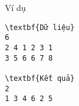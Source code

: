 Ví dụ
\begin{verbatim}
\textbf{Dữ liệu}
6
2 4 1 2 3 1
3 5 6 6 7 8

\textbf{Kết quả}
2
1 3 4 6 2 5
\end{verbatim}